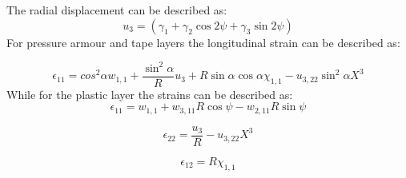 \noindent The radial displacement can be described as:
\begin{equation}
    u_3=(\gamma_1 + \gamma_2 \cos 2 \psi + \gamma_3 \sin2 \psi)
\end{equation}
\noindent For pressure armour and tape layers the longitudinal strain can be described as:

\begin{equation}
    \epsilon_{11}=cos^2 \alpha w_{1,1} + \frac{\sin^2 \alpha}{R} u_3 + R \sin \alpha \cos \alpha \chi_{1,1}-u_{3,22} \sin^2 \alpha X^3
\end{equation}
While for the plastic layer the strains can be described as:
\begin{equation}
    \epsilon_{11}=w_{1,1} + w_{3,11}R \cos \psi - w_{2,11}R \sin {\psi}
\end{equation}

\begin{equation}
    \epsilon_{22}=\frac{u_3}{R}-u_{3,22} X^3
\end{equation}

\begin{equation}
    \epsilon_{12}=R\chi_{1,1}
\end{equation}

